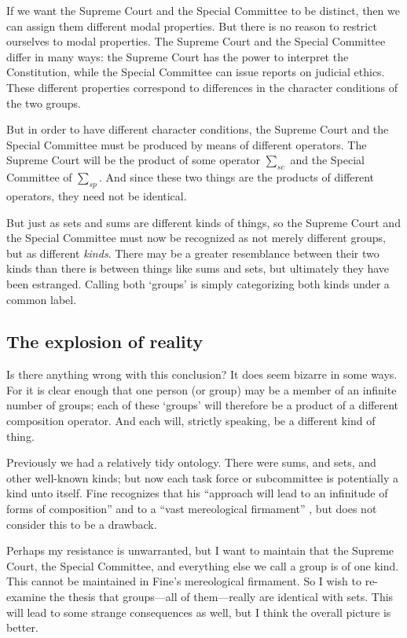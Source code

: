 \documentclass[11pt]{article}
\begin{document}
\begin{spacing}{1.5}
If we want the Supreme Court and the Special Committee to be distinct,
then we can assign them different modal properties.  But there is no
reason to restrict ourselves to modal properties.  The Supreme Court
and the Special Committee differ in many ways: the Supreme Court has
the power to interpret the Constitution, while the Special Committee
can issue reports on judicial ethics.  These different properties
correspond to differences in the character conditions of the two
groups.

But in order to have different character conditions, the Supreme Court
and the Special Committee must be produced by means of different
operators.  The Supreme Court will be the product of some operator
$\sum _{sc}$ and the Special Committee of $\sum _{sp}$.  And since
these two things are the products of different operators, they need
not be identical.

But just as sets and sums are different kinds of things, so the
Supreme Court and the Special Committee must now be recognized as not
merely different groups, but as different {\em kinds}.  There may be a
greater resemblance between their two kinds than there is between
things like sums and sets, but ultimately they have been estranged.
Calling both `groups' is simply categorizing both kinds under a common
label.

\subsection{The explosion of reality}
Is there anything wrong with this conclusion?  It does seem bizarre in
some ways.  For it is clear enough that one person (or group) may be a
member of an infinite number of groups; each of these `groups' will
therefore be a product of a different composition operator.  And each
will, strictly speaking, be a different kind of thing.

Previously we had a relatively tidy ontology.  There were sums, and
sets, and other well-known kinds; but now each task force or
subcommittee is potentially a kind unto itself.  Fine recognizes that
his ``approach will lead to an infinitude of forms of composition''
and to a ``vast mereological firmament'' \citeyearpar[576]{fine2010},
but does not consider this to be a drawback.

Perhaps my resistance is unwarranted, but I want to maintain that the
Supreme Court, the Special Committee, and everything else we call a
group is of one kind.  This cannot be maintained in Fine's
mereological firmament.  So I wish to re-examine the thesis that
groups---all of them---really are identical with sets.  This will lead
to some strange consequences as well, but I think the overall picture
is better.


\end{spacing}
\end{document}
